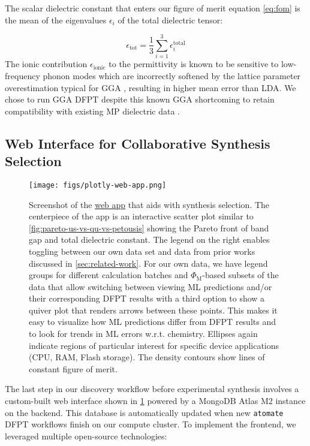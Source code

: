 \documentclass{article}
\newcommand{\fom}[1][]{\Phi_\text{M#1}}
\newcommand{\epstot}{\epsilon_\text{tot}}
\newcommand{\epsionic}{\epsilon_\text{ionic}}
\begin{document}
The scalar dielectric constant that enters our figure of merit equation \cref{eq:fom} is the mean of the eigenvalues $\epsilon_i$ of the total dielectric tensor:

\begin{equation}
    \epstot
    = \frac{1}{3} \sum_{i=1}^3 \epsilon_i^\text{total}
\end{equation}
The ionic contribution $\epsionic$ to the permittivity is known to be sensitive to low-frequency phonon modes which are incorrectly softened by the lattice parameter overestimation typical for GGA \cite{yim_novel_2015}, resulting in higher mean error than LDA.
We chose to run GGA DFPT despite this known GGA shortcoming to retain compatibility with existing MP dielectric data \cite{petousis_benchmarking_2016, petousis_high-throughput_2017}.


\subsection{Web Interface for Collaborative Synthesis Selection}
\label{sec:web-interface}

\begin{figure}
    \centering
    \texttt{[image: figs/plotly-web-app.png]}
    \caption{
        Screenshot of the \href{https://janosh.github.io/dielectrics}{web app} that aids with synthesis selection.
        The centerpiece of the app is an interactive scatter plot similar to \cref{fig:pareto-us-vs-qu-vs-petousis} showing the Pareto front of band gap and total dielectric constant. The legend on the right enables toggling between our own data set and data from prior works discussed in \cref{sec:related-work}. For our own data, we have legend groups for different calculation batches and $\fom$-based subsets of the data that allow switching between viewing ML predictions and/or their corresponding DFPT results with a third option to show a quiver plot that renders arrows between these points. This makes it easy to visualize how ML predictions differ from DFPT results and to look for trends in ML errors w.r.t. chemistry. Ellipses again indicate regions of particular interest for specific device applications (CPU, RAM, Flash storage). The density contours show lines of constant figure of merit.
    }
    \label{fig:plotly-web-app}
\end{figure}

The last step in our discovery workflow before experimental synthesis involves a custom-built web interface shown in \cref{fig:plotly-web-app} powered by a MongoDB Atlas M2 instance on the backend. This database is automatically updated when new \texttt{atomate} \cite{mathew_atomate_2017} DFPT workflows finish on our compute cluster. To implement the frontend, we leveraged multiple open-source technologies:
\end{document}
